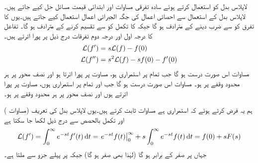 لاپلاس بدل کو استعمال کرتے ہوئے سادہ تفرقی مساوات اور ابتدائی قیمت مسائل حل کیے جاتے ہیں۔لاپلاس بدل کے استعمال سے  احصائی اعمال کی جگہ الجبرائی اعمال استعمال کیے جاتے ہیں۔یوں  کا تفرق  کو  سے ضرب دینے کے مترادف ہو گا جبکہ  کا تکمل   کو  سے تقسیم کرنے کے مترادف ہو گا۔ 
تفاعل  کا درجہ اول اور درجہ دوم تفرقات درج ذیل پر پورا اترتے ہیں۔
\begin{align}
\mathcal{L}(f')&=s\mathcal{L}(f)-f(0) \label{مساوات_لاپلاس_درجہ_اول_تفرق}\\
\mathcal{L}(f'')&=s^2\mathcal{L}(f)-sf(0)-f'(0)  \label{مساوات_لاپلاس_درجہ_دوم_تفرق}
\end{align}
مساوات  اس صورت درست ہو گا جب  تمام  پر استمراری ہو، مساوت  پر پورا اترتا ہو اور  نصف محور  پر ہر محدود وقفے پر  ہو۔ مساوات  اس صورت درست ہو گا جب  اور  تمام  پر استمراری ہوں، مساوت  پر پورا اترتے ہوں اور  نصف محور  پر ہر محدود وقفے پر  ہو۔

ہم یہ  فرض کرتے ہوئے  کہ   استمراری ہے مساوات  ثابت کرتے ہیں۔یوں لاپلاس بدل کی تعریف (مساوات ) اور تکمل بالحصص سے درج ذیل لکھا جا سکتا ہے
\begin{align*}
\Laplace(f')=\int_{0}^{\infty} e^{-st} f'(t)\dif t=\left. e^{-st} f(t) \right|_{0}^{\infty}+s\int_{0}^{\infty} e^{-st}f(t)\dif t=f(0)+sF(s)
\end{align*}
جہاں  پر  صفر کے برابر ہو گا (لہٰذا  بھی صفر ہو گا) جبکہ  پر پہلے جزو سے  ملتا ہے۔ 
